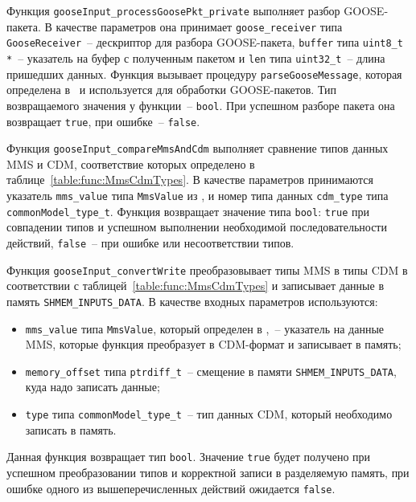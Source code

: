Функция \lstinline{gooseInput_processGoosePkt_private} выполняет разбор GOOSE-пакета. В качестве параметров она принимает \lstinline{goose_receiver} типа
\lstinline{GooseReceiver}~-- дескриптор
для разбора GOOSE-пакета, \lstinline{buffer} типа \lstinline{uint8_t *}~-- указатель на буфер с полученным пакетом и \lstinline{len} типа \lstinline{uint32_t}~-- длина пришедших данных. Функция вызывает процедуру \lstinline{parseGooseMessage},
которая определена в \libIec\ и используется для обработки GOOSE-пакетов. Тип возвращаемого значения у функции~-- \lstinline{bool}. При успешном разборе пакета она возвращает
\lstinline{true}, при ошибке~-- \lstinline{false}.

Функция \lstinline{gooseInput_compareMmsAndCdm} выполняет сравнение типов данных MMS и CDM, соответствие которых определено в таблице~\ref{table:func:MmsCdmTypes}.
В качестве параметров принимаются указатель
\lstinline{mms_value} типа \lstinline{MmsValue} из \libIec, и номер типа данных
\lstinline{cdm_type} типа \lstinline{commonModel_type_t}. Функция возвращает значение типа
\lstinline{bool}: \lstinline{true} при совпадении типов и успешном выполнении
необходимой последовательности действий, \lstinline{false}~-- при ошибке или
несоответствии типов.


Функция \lstinline{gooseInput_convertWrite} преобразовывает типы MMS в типы CDM
в соответствии с таблицей~\ref{table:func:MmsCdmTypes} и записывает данные в память \lstinline{SHMEM_INPUTS_DATA}. В качестве входных параметров используются:

\begin{itemize}
    \item \lstinline{mms_value} типа \lstinline{MmsValue}, который определен в \libIec,~-- указатель на данные MMS, которые функция преобразует в CDM-формат и записывает в память;
    \item \lstinline{memory_offset} типа \lstinline{ptrdiff_t}~-- смещение в памяти \lstinline{SHMEM_INPUTS_DATA}, куда надо записать данные;
    \item \lstinline{type} типа \lstinline{commonModel_type_t}~-- тип данных CDM, который необходимо записать в память.
\end{itemize}

Данная функция возвращает тип \lstinline{bool}. Значение \lstinline{true} будет получено при успешном преобразовании типов и корректной записи в разделяемую память, при
ошибке одного из вышеперечисленных действий ожидается \lstinline{false}.

